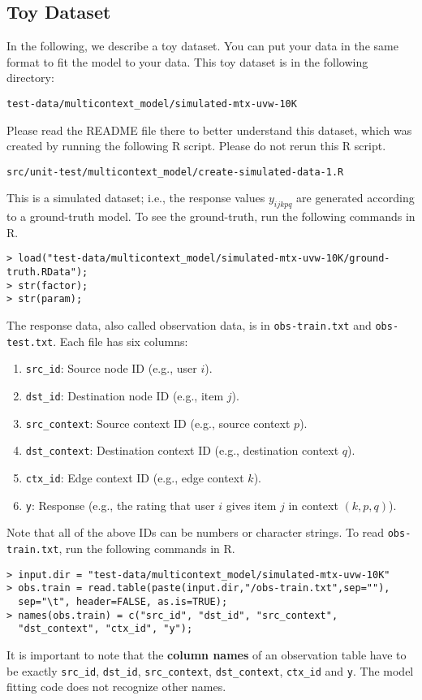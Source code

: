 \documentclass[10pt]{article}
\newcommand{\parahead}[1]{\vspace{0.15in}\noindent{\bf #1:}}
\begin{document}
\subsection{Toy Dataset}

In the following, we describe a toy dataset.  You can put your data in the same format to fit the model to your data.  This toy dataset is in the following directory:
\begin{verbatim}
test-data/multicontext_model/simulated-mtx-uvw-10K
\end{verbatim}
Please read the README file there to better understand this dataset, which was created by running the following R script.  Please do not rerun this R script.
\begin{verbatim}
src/unit-test/multicontext_model/create-simulated-data-1.R
\end{verbatim}
This is a simulated dataset; i.e., the response values $y_{ijkpq}$ are generated according to a ground-truth model.  To see the ground-truth, run the following commands in R.
{\small
\begin{verbatim}
> load("test-data/multicontext_model/simulated-mtx-uvw-10K/ground-truth.RData");
> str(factor);
> str(param);
\end{verbatim}
}

\parahead{Response Data}
The response data, also called observation data, is in {\tt obs-train.txt} and {\tt obs-test.txt}.  Each file has six columns:
\begin{enumerate}
\item {\tt src\_id}: Source node ID (e.g., user $i$).
\item {\tt dst\_id}: Destination node ID (e.g., item $j$).
\item {\tt src\_context}: Source context ID (e.g., source context $p$).
\item {\tt dst\_context}: Destination context ID (e.g., destination context $q$).
\item {\tt ctx\_id}: Edge context ID (e.g., edge context $k$).
\item {\tt y}: Response (e.g., the rating that user $i$ gives item $j$ in context $(k,p,q)$).
\end{enumerate}
Note that all of the above IDs can be numbers or character strings.
To read {\tt obs-train.txt}, run the following commands in R.
{\small
\begin{verbatim}
> input.dir = "test-data/multicontext_model/simulated-mtx-uvw-10K"
> obs.train = read.table(paste(input.dir,"/obs-train.txt",sep=""),
  sep="\t", header=FALSE, as.is=TRUE);
> names(obs.train) = c("src_id", "dst_id", "src_context", 
  "dst_context", "ctx_id", "y");
\end{verbatim}
}
It is important to note that the {\bf column names} of an observation table have to be exactly {\tt src\_id}, {\tt dst\_id}, {\tt src\_context}, {\tt dst\_context}, {\tt ctx\_id} and {\tt y}.  The model fitting code does not recognize other names.
\end{document}
